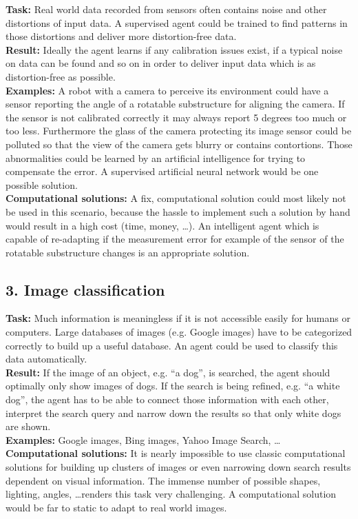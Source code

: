 \documentclass[10pt,a4paper]{article}
\begin{document}
			\textbf{Task:} Real world data recorded from sensors often contains noise and other distortions of input data. A supervised agent could be trained to find patterns in those distortions and deliver more distortion-free data.
			\\
			\textbf{Result:} Ideally the agent learns if any calibration issues exist, if a typical noise on data can be found and so on in order to deliver input data which is as distortion-free as possible.
			\\
			\textbf{Examples:} A robot with a camera to perceive its environment could have a sensor reporting the angle of a rotatable substructure for aligning the camera. If the sensor is not calibrated correctly it may always report 5 degrees too much or too less. Furthermore the glass of the camera protecting its image sensor could be polluted so that the view of the camera gets blurry or contains contortions. Those abnormalities could be learned by an artificial intelligence for trying to compensate the error. A supervised artificial neural network would be one possible solution.
			\\
			\textbf{Computational solutions:} A fix, computational solution could most likely not be used in this scenario, because the hassle to implement such a solution by hand would result in a high cost (time, money, \dots). An intelligent agent which is capable of re-adapting if the measurement error for example of the sensor of the rotatable substructure changes is an appropriate solution.
		
		\subsection*{3. Image classification}
		
			\textbf{Task:} Much information is meaningless if it is not accessible easily for humans or computers. Large databases of images (e.g. Google images) have to be categorized correctly to build up a useful database. An agent could be used to classify this data automatically. 
			\\
			\textbf{Result:} If the image of an object, e.g. \enquote{a dog}, is searched, the agent should optimally only show images of dogs. If the search is being refined, e.g. \enquote{a white dog}, the agent has to be able to connect those information with each other, interpret the search query and narrow down the results so that only white dogs are shown.
			\\
			\textbf{Examples:} Google images, Bing images, Yahoo Image Search, \dots
			\\
			\textbf{Computational solutions:} It is nearly impossible to use classic computational solutions for building up clusters of images or even narrowing down search results dependent on visual information. The immense number of possible shapes, lighting, angles, \dots renders this task very challenging. A computational solution would be far to static to adapt to real world images.
			
\end{document}
